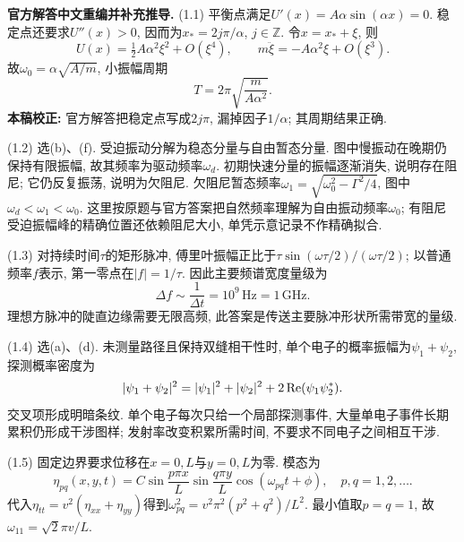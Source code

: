 \begin{solution}
\textbf{官方解答中文重编并补充推导.}
(1.1) 平衡点满足$U'(x)=A\alpha\sin(\alpha x)=0$. 稳定点还要求$U''(x)>0$, 因而为$x_*=2j\pi/\alpha$, $j\in\mathbb Z$. 令$x=x_*+\xi$, 则
\[
U(x)=\tfrac12 A\alpha^2\xi^2+O(\xi^4),\qquad
m\ddot\xi=-A\alpha^2\xi+O(\xi^3).
\]
故$\omega_0=\alpha\sqrt{A/m}$, 小振幅周期
\[
T=2\pi\sqrt{\frac{m}{A\alpha^2}}.
\]
\textbf{本稿校正:} 官方解答把稳定点写成$2j\pi$, 漏掉因子$1/\alpha$; 其周期结果正确.

(1.2) 选(b)、(f). 受迫振动分解为稳态分量与自由暂态分量. 图中慢振动在晚期仍保持有限振幅, 故其频率为驱动频率$\omega_d$. 初期快速分量的振幅逐渐消失, 说明存在阻尼; 它仍反复振荡, 说明为欠阻尼. 欠阻尼暂态频率$\omega_1=\sqrt{\omega_0^2-\Gamma^2/4}$, 图中$\omega_d<\omega_1<\omega_0$. 这里按原题与官方答案把自然频率理解为自由振动频率$\omega_0$; 有阻尼受迫振幅峰的精确位置还依赖阻尼大小, 单凭示意记录不作精确拟合.

(1.3) 对持续时间$\tau$的矩形脉冲, 傅里叶振幅正比于$\tau\sin(\omega\tau/2)/(\omega\tau/2)$; 以普通频率$f$表示, 第一零点在$|f|=1/\tau$. 因此主要频谱宽度量级为
\[
\Delta f\sim\frac1{\Delta t}=10^9\,\mathrm{Hz}=1\,\mathrm{GHz}.
\]
理想方脉冲的陡直边缘需要无限高频, 此答案是传送主要脉冲形状所需带宽的量级.

(1.4) 选(a)、(d). 未测量路径且保持双缝相干性时, 单个电子的概率振幅为$\psi_1+\psi_2$, 探测概率密度为
\[
|\psi_1+\psi_2|^2=|\psi_1|^2+|\psi_2|^2+2\operatorname{Re}(\psi_1\psi_2^*).
\]
交叉项形成明暗条纹. 单个电子每次只给一个局部探测事件, 大量单电子事件长期累积仍形成干涉图样; 发射率改变积累所需时间, 不要求不同电子之间相互干涉.

(1.5) 固定边界要求位移在$x=0,L$与$y=0,L$为零. 模态为
\[
\eta_{pq}(x,y,t)=C\sin\frac{p\pi x}{L}\sin\frac{q\pi y}{L}\cos(\omega_{pq}t+\phi),\quad p,q=1,2,\ldots.
\]
代入$\eta_{tt}=v^2(\eta_{xx}+\eta_{yy})$得到$\omega_{pq}^2=v^2\pi^2(p^2+q^2)/L^2$. 最小值取$p=q=1$, 故$\omega_{11}=\sqrt2\pi v/L$.
\end{solution}

